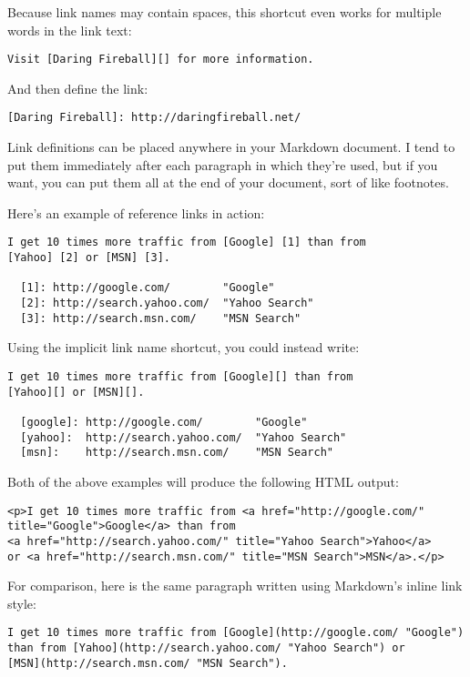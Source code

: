 Because link names may contain spaces, this shortcut even works for
multiple words in the link text:

\begin{verbatim}
Visit [Daring Fireball][] for more information.
\end{verbatim}

And then define the link:

\begin{verbatim}
[Daring Fireball]: http://daringfireball.net/
\end{verbatim}

Link definitions can be placed anywhere in your Markdown document. I
tend to put them immediately after each paragraph in which they're
used, but if you want, you can put them all at the end of your
document, sort of like footnotes.

Here's an example of reference links in action:

\begin{verbatim}
I get 10 times more traffic from [Google] [1] than from
[Yahoo] [2] or [MSN] [3].

  [1]: http://google.com/        "Google"
  [2]: http://search.yahoo.com/  "Yahoo Search"
  [3]: http://search.msn.com/    "MSN Search"
\end{verbatim}

Using the implicit link name shortcut, you could instead write:

\begin{verbatim}
I get 10 times more traffic from [Google][] than from
[Yahoo][] or [MSN][].

  [google]: http://google.com/        "Google"
  [yahoo]:  http://search.yahoo.com/  "Yahoo Search"
  [msn]:    http://search.msn.com/    "MSN Search"
\end{verbatim}

Both of the above examples will produce the following HTML output:

\begin{verbatim}
<p>I get 10 times more traffic from <a href="http://google.com/"
title="Google">Google</a> than from
<a href="http://search.yahoo.com/" title="Yahoo Search">Yahoo</a>
or <a href="http://search.msn.com/" title="MSN Search">MSN</a>.</p>
\end{verbatim}

For comparison, here is the same paragraph written using
Markdown's inline link style:

\begin{verbatim}
I get 10 times more traffic from [Google](http://google.com/ "Google")
than from [Yahoo](http://search.yahoo.com/ "Yahoo Search") or
[MSN](http://search.msn.com/ "MSN Search").
\end{verbatim}

